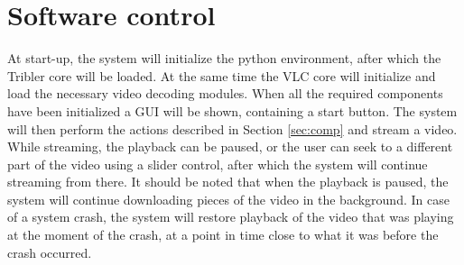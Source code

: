 \section{Software control}
\label{sec:softctrl}
At start-up, the system will initialize the python environment, after which the Tribler core will be loaded. At the same time the VLC core will initialize and load the necessary video decoding modules. When all the required components have been initialized a GUI will be shown, containing a start button. The system will then perform the actions described in Section \ref{sec:comp} and stream a video. While streaming, the playback can be paused, or the user can seek to a different part of the video using a slider control, after which the system will continue streaming from there. It should be noted that when the playback is paused, the system will continue downloading pieces of the video in the background. In case of a system crash, the system will restore playback of the video that was playing at the moment of the crash, at a point in time close to what it was before the crash occurred.